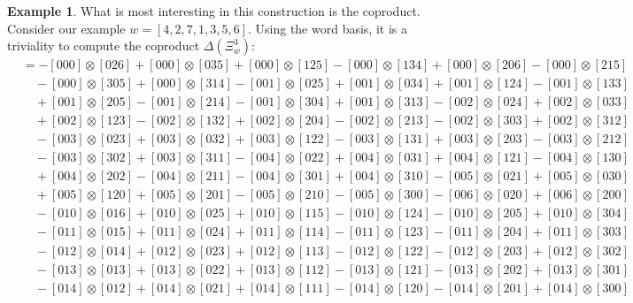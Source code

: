 \documentclass{amsart}
\theoremstyle{definition}
\newtheorem{example}[lemma]{Example}
\theoremstyle{remark}
\numberwithin{equation}{subsection}
\newcommand{\dsch}{\ensuremath{\Xi}}
\begin{document}
\begin{example} \label{example:coproduct}
What is most interesting in this construction is the coproduct. Consider our example $w=[4,2,7,1,3,5,6]$. Using the word basis, it is a triviality to compute the coproduct $\Delta(\dsch_w^3)$:
\begin{align*}
&= - [000] \otimes [026] + [000] \otimes [035] + [000] \otimes [125] - [000] \otimes [134] + [000] \otimes [206] - [000] \otimes [215] \\
&\quad - [000] \otimes [305] + [000] \otimes [314] - [001] \otimes [025] + [001] \otimes [034] + [001] \otimes [124] - [001] \otimes [133] \\
&\quad + [001] \otimes [205] - [001] \otimes [214] - [001] \otimes [304] + [001] \otimes [313] - [002] \otimes [024] + [002] \otimes [033] \\
&\quad + [002] \otimes [123] - [002] \otimes [132] + [002] \otimes [204] - [002] \otimes [213] - [002] \otimes [303] + [002] \otimes [312] \\
&\quad - [003] \otimes [023] + [003] \otimes [032] + [003] \otimes [122] - [003] \otimes [131] + [003] \otimes [203] - [003] \otimes [212] \\
&\quad - [003] \otimes [302] + [003] \otimes [311] - [004] \otimes [022] + [004] \otimes [031] + [004] \otimes [121] - [004] \otimes [130] \\
&\quad + [004] \otimes [202] - [004] \otimes [211] - [004] \otimes [301] + [004] \otimes [310] - [005] \otimes [021] + [005] \otimes [030] \\
&\quad + [005] \otimes [120] + [005] \otimes [201] - [005] \otimes [210] - [005] \otimes [300] - [006] \otimes [020] + [006] \otimes [200] \\
&\quad - [010] \otimes [016] + [010] \otimes [025] + [010] \otimes [115] - [010] \otimes [124] - [010] \otimes [205] + [010] \otimes [304] \\
&\quad - [011] \otimes [015] + [011] \otimes [024] + [011] \otimes [114] - [011] \otimes [123] - [011] \otimes [204] + [011] \otimes [303] \\
&\quad - [012] \otimes [014] + [012] \otimes [023] + [012] \otimes [113] - [012] \otimes [122] - [012] \otimes [203] + [012] \otimes [302] \\
&\quad - [013] \otimes [013] + [013] \otimes [022] + [013] \otimes [112] - [013] \otimes [121] - [013] \otimes [202] + [013] \otimes [301] \\
&\quad - [014] \otimes [012] + [014] \otimes [021] + [014] \otimes [111] - [014] \otimes [120] - [014] \otimes [201] + [014] \otimes [300] \\

\end{align*}
\end{example}
\end{document}
